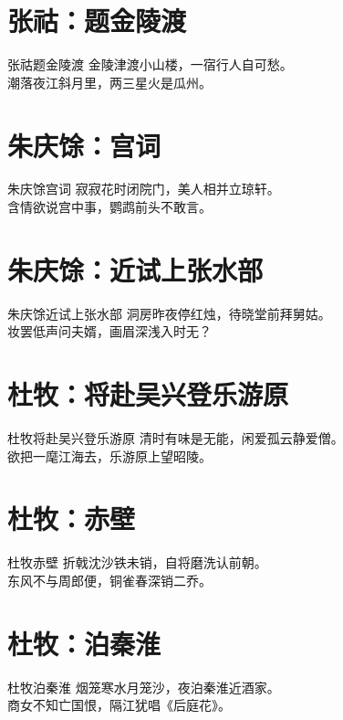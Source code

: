\documentclass[12pt,oneside,a5paper]{book}
\begin{document}
\chapter{张祜：题金陵渡}
\begin{poemzh}{张祜}{题金陵渡}
金陵津渡小山楼，一宿行人自可愁。\\
潮落夜江斜月里，两三星火是瓜州。\\ 
\end{poemzh}

\chapter{朱庆馀：宫词}
\begin{poemzh}{朱庆馀}{宫词}
寂寂花时闭院门，美人相并立琼轩。\\
含情欲说宫中事，鹦鹉前头不敢言。\\ 
\end{poemzh}

\chapter{朱庆馀：近试上张水部}
\begin{poemzh}{朱庆馀}{近试上张水部}
洞房昨夜停红烛，待晓堂前拜舅姑。\\
妆罢低声问夫婿，画眉深浅入时无？\\ 
\end{poemzh}

\chapter{杜牧：将赴吴兴登乐游原}
\begin{poemzh}{杜牧}{将赴吴兴登乐游原}
清时有味是无能，闲爱孤云静爱僧。\\
欲把一麾江海去，乐游原上望昭陵。\\ 
\end{poemzh}

\chapter{杜牧：赤壁}
\begin{poemzh}{杜牧}{赤壁}
折戟沈沙铁未销，自将磨洗认前朝。\\
东风不与周郎便，铜雀春深销二乔。\\ 
\end{poemzh}

\chapter{杜牧：泊秦淮}
\begin{poemzh}{杜牧}{泊秦淮}
烟笼寒水月笼沙，夜泊秦淮近酒家。\\
商女不知亡国恨，隔江犹唱《后庭花》。\\ 
\end{poemzh}
\end{document}
